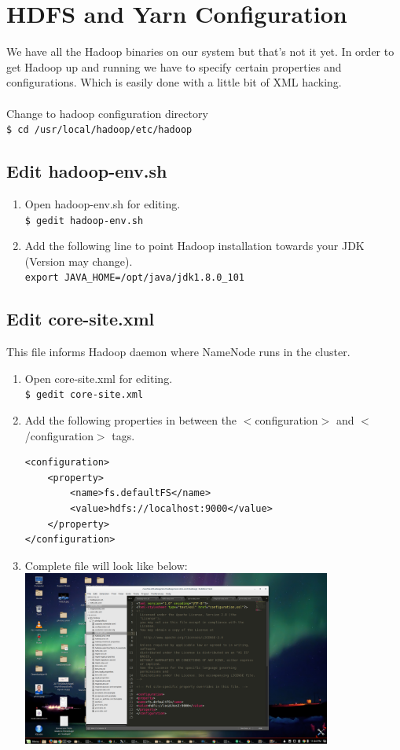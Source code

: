 \documentclass[12pt]{article}%
\begin{document}
\section{HDFS and Yarn Configuration}
We have all the Hadoop binaries on our system but that's not it yet. In order to get Hadoop up and running we have to specify certain properties and configurations. Which is easily done with a little bit of XML hacking.\\\\
Change to hadoop configuration directory\\
\lstinline{$ cd /usr/local/hadoop/etc/hadoop}
\subsection{Edit hadoop-env.sh}
\begin{enumerate}
\item Open hadoop-env.sh for editing.\\
\lstinline{$ gedit hadoop-env.sh}
\item Add the following line to point Hadoop installation towards your JDK (Version may change).\\
\lstinline{export JAVA_HOME=/opt/java/jdk1.8.0_101}
\end{enumerate}

\subsection{Edit core-site.xml}
This file informs Hadoop daemon
where NameNode runs in the cluster.
\begin{enumerate}
\item Open core-site.xml for editing.\\
\lstinline{$ gedit core-site.xml}
\item Add the following properties in between the $<$configuration$>$ and $<$/configuration$>$ tags.\\
\begin{lstlisting}
<configuration>
	<property>
		<name>fs.defaultFS</name>
		<value>hdfs://localhost:9000</value>
	</property>
</configuration>
\end{lstlisting}

\item Complete file will look like below:\\
\includegraphics[width=0.8\textwidth]{core-site.png}
\end{enumerate}
\end{document}
